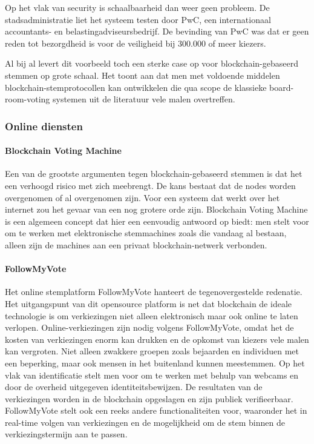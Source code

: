 				Op het vlak van security is schaalbaarheid dan weer geen probleem. De stadsadministratie liet het systeem testen door PwC, een internationaal accountants- en belastingadviseursbedrijf. De bevinding van PwC was dat er geen reden tot bezorgdheid is voor de veiligheid bij  300.000 of meer kiezers. 
				
				Al bij al levert dit voorbeeld toch een sterke case op voor blockchain-gebaseerd stemmen op grote schaal. Het toont aan dat men met voldoende middelen blockchain-stemprotocollen kan ontwikkelen die qua scope de klassieke board-room-voting systemen uit de literatuur vele malen overtreffen. 
			\subsubsection{Online diensten}
				\paragraph{Blockchain Voting Machine }
					Een van de grootste argumenten tegen blockchain-gebaseerd stemmen is dat het een verhoogd risico met zich meebrengt. De kans bestaat dat de nodes worden overgenomen of al overgenomen zijn. Voor een systeem dat werkt over het internet zou het gevaar van een nog grotere orde zijn. Blockchain Voting Machine is een algemeen concept dat hier een eenvoudig antwoord op biedt: men stelt voor om te werken met elektronische stemmachines zoals die vandaag al bestaan,  alleen zijn de machines aan een privaat blockchain-netwerk verbonden. ~\autocite{Kshetri2018}
				\paragraph{FollowMyVote}
					Het online stemplatform FollowMyVote hanteert de tegenovergestelde redenatie. Het uitgangspunt van dit opensource platform is net dat blockchain de ideale technologie is om verkiezingen niet alleen elektronisch maar ook online te laten verlopen. Online-verkiezingen zijn nodig volgens FollowMyVote, omdat het de kosten van verkiezingen enorm kan drukken en de opkomst van kiezers vele malen kan vergroten.  Niet alleen zwakkere groepen zoals bejaarden en individuen met een beperking, maar ook mensen in het buitenland kunnen meestemmen.  Op het vlak van identificatie stelt men voor om te werken met behulp van webcams en door de overheid uitgegeven identiteitsbewijzen. De resultaten van de verkiezingen worden in de blockchain opgeslagen en zijn publiek verifieerbaar. FollowMyVote stelt ook een reeks andere functionaliteiten voor, waaronder het in real-time volgen van verkiezingen en de mogelijkheid om de stem binnen de verkiezingstermijn aan te passen. ~\autocite{Kshetri2018}
